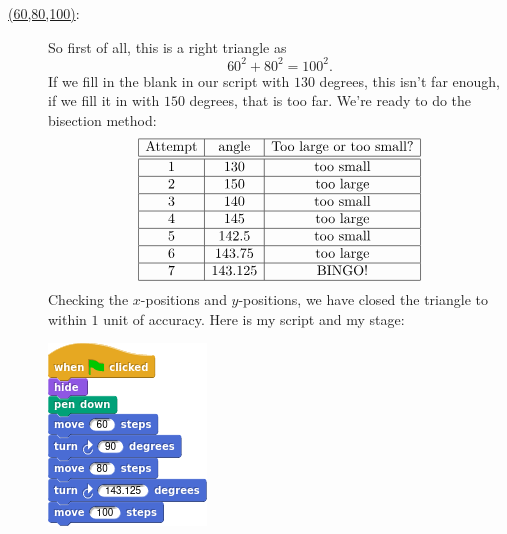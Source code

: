 \documentclass[noauthor,nooutcomes,handout,12pt]{ximera}
\begin{document}
\begin{question}
\begin{freeResponse}
\begin{description}
      \item[\underline{(60,80,100)}:] So first of all, this is a right
        triangle as
        \[
        60^2 + 80^2 = 100^2.
        \]
        If we fill in the blank in our script with $130$ degrees, this
        isn't far enough, if we fill it in with $150$ degrees, that is
        too far. We're ready to do the bisection method:
        \[
        \begin{array}{|c|c|c|c|}\hline
          \text{Attempt} & \text{angle} & \text{Too large or too small?} \\ \hline\hline
          1 & 130 & \text{too small} \\ \hline
          2 & 150 & \text{too large}  \\ \hline
          3 & 140 & \text{too small}  \\ \hline
          4 & 145 & \text{too large}  \\ \hline
          5 & 142.5 & \text{too small}  \\ \hline
          6 & 143.75 & \text{too large}  \\ \hline
          7 & 143.125 & \text{BINGO!}  \\ \hline
        \end{array}
        \]
        Checking the $x$-positions and $y$-positions, we have closed
        the triangle to within $1$ unit of accuracy. Here is my script and my stage:
        \begin{center}
          \includegraphics[width=.3\textwidth]{6080100-script.png}   \qquad {}
        \end{center}
    \end{description}
  \end{freeResponse}
\end{question}
\mynewpage
\end{document}

